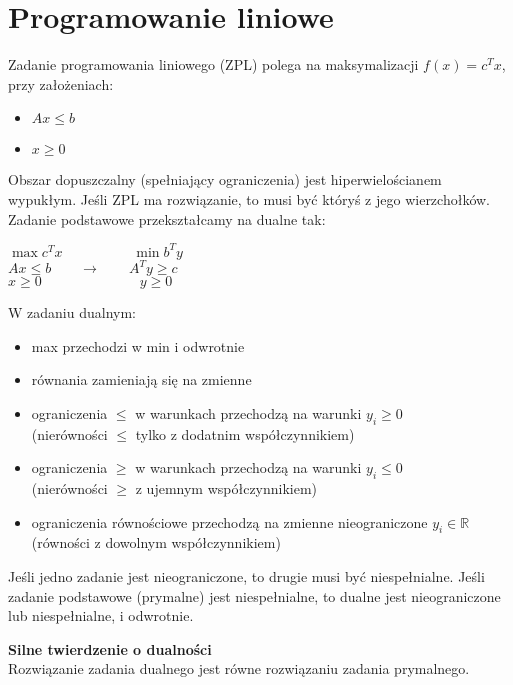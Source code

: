 \section{Programowanie liniowe}
Zadanie programowania liniowego (ZPL) polega na maksymalizacji \( f(x) = c^Tx \), przy założeniach:
\begin{itemize}
	\onehalfspacing
	\item \( Ax \leq b \)
	\item \( x \geq 0 \)
\end{itemize}
Obszar dopuszczalny (spełniający ograniczenia) jest hiperwielościanem wypukłym. Jeśli ZPL ma rozwiązanie, to musi być któryś z jego wierzchołków. \\
Zadanie podstawowe przekształcamy na dualne tak:
\begin{center}
	\( \max c^Tx \quad\quad\quad\quad\quad \min b^Ty \) \\
	\( Ax \leq b \quad\quad\rightarrow\quad\quad A^Ty \geq c \) \\
	\( x \geq 0 \quad\quad\quad\quad\quad\quad\quad y \geq 0 \)
\end{center}

W zadaniu dualnym:
\begin{itemize}
	\onehalfspacing
	\item max przechodzi w min i odwrotnie
	\item równania zamieniają się na zmienne
	\item ograniczenia \( \leq \) w warunkach przechodzą na warunki \( y_i \geq 0 \) \\
	      (nierówności \( \leq \) tylko z dodatnim współczynnikiem)
	\item ograniczenia \( \geq \) w warunkach przechodzą na warunki \( y_i \leq 0 \) \\
	      (nierówności \( \geq \) z ujemnym współczynnikiem)
	\item ograniczenia równościowe przechodzą na zmienne nieograniczone \( y_i \in \mathbb{R} \) \\
	      (równości z dowolnym współczynnikiem)
\end{itemize}
Jeśli jedno zadanie jest nieograniczone, to drugie musi być niespełnialne.
Jeśli zadanie podstawowe (prymalne) jest niespełnialne, to dualne jest nieograniczone lub niespełnialne, i odwrotnie.

\noindent
\textbf{Silne twierdzenie o dualności} \\
Rozwiązanie zadania dualnego jest równe rozwiązaniu zadania prymalnego.